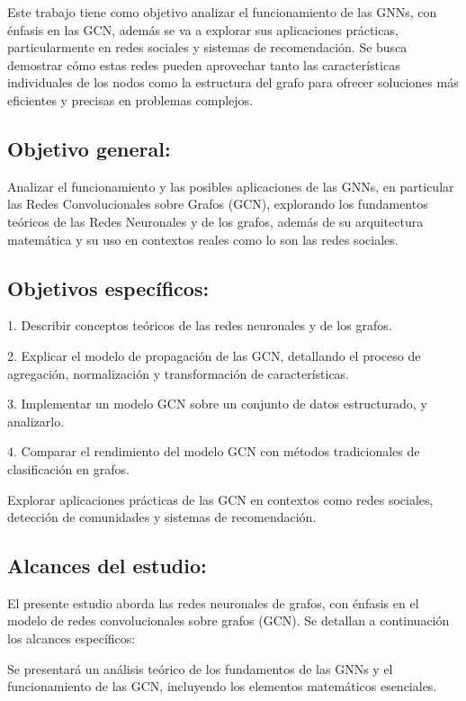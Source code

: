\documentclass[11pt]{article} %
\begin{document}
Este trabajo tiene como objetivo analizar el funcionamiento de las GNNs, con énfasis en las GCN, además se va a explorar sus aplicaciones prácticas, particularmente en redes sociales y sistemas de recomendación. Se busca demostrar cómo estas redes pueden aprovechar tanto las características individuales de los nodos como la estructura del grafo para ofrecer soluciones más eficientes y precisas en problemas complejos. 
\vspace{5pt}
\subsection{Objetivo general:}
\vspace{3pt}
 Analizar el funcionamiento y las posibles aplicaciones de las GNNs, en particular las Redes Convolucionales sobre Grafos (GCN), explorando los fundamentos teóricos de las Redes Neuronales y de los grafos, además de su arquitectura matemática y su uso en contextos reales como lo son las redes sociales.
 \vspace{5pt}
\subsection{Objetivos específicos:}
\vspace{3pt}
    1. Describir conceptos teóricos de las redes neuronales y de los grafos. 

    2. Explicar el modelo de propagación de las GCN, detallando el proceso de agregación, normalización y transformación de características. 

    3. Implementar un modelo GCN sobre un conjunto de datos estructurado, y analizarlo. 

    4. Comparar el rendimiento del modelo GCN con métodos tradicionales de clasificación en grafos. 

    Explorar aplicaciones prácticas de las GCN en contextos como redes sociales, detección de comunidades y sistemas de recomendación. 
\vspace{5pt}
\subsection{Alcances del estudio:}
\vspace{3pt}
    El presente estudio aborda las redes neuronales de grafos, con énfasis en el modelo de redes convolucionales sobre grafos (GCN). Se detallan a continuación los alcances específicos: 

    Se presentará un análisis teórico de los fundamentos de las GNNs y el funcionamiento de las GCN, incluyendo los elementos matemáticos esenciales. 
\end{document}
